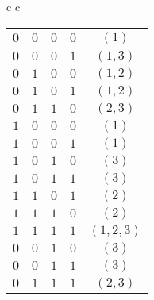 \documentclass[12pt,a4paper]{article}
\begin{document}
\begin{table}[h!]
\begin{tabular}{c c}
\begin{tabular}{|c|c|c|c||c|}
			$0$ & $0$ & $0$ & $0$ & $(1)$  \\
			\hline
			$0$ & $0$ & $0$ & $1$ & $(1,3)$  \\
			\hline
			$0$ & $1$ & $0$ & $0$ & $(1,2)$  \\
			\hline
			$0$ & $1$ & $0$ & $1$ & $(1,2)$  \\
			\hline
			$0$ & $1$ & $1$ & $0$ & $(2,3)$  \\
			\hline
			$1$ & $0$ & $0$ & $0$ & $(1)$  \\
			\hline
			$1$ & $0$ & $0$ & $1$ & $(1)$  \\
			\hline
			$1$ & $0$ & $1$ & $0$ & $(3)$ \\
			\hline
			$1$ & $0$ & $1$ & $1$ & $(3)$  \\
			\hline
			$1$ & $1$ & $0$ & $1$ & $(2)$ \\
			\hline
			$1$ & $1$ & $1$ & $0$ & $(2)$  \\
			\hline
			$1$ & $1$ & $1$ & $1$ & $(1,2,3)$  \\
			\hline
			$0$ & $0$ & $1$ & $0$ & $(3)$  \\
			\hline
			$0$ & $0$ & $1$ & $1$ & $(3)$  \\
			\hline
			$0$ & $1$ & $1$ & $1$ & $(2,3)$  \\
			\hline
		\end{tabular}\\


\end{tabular}
\end{table} 
\end{document}

